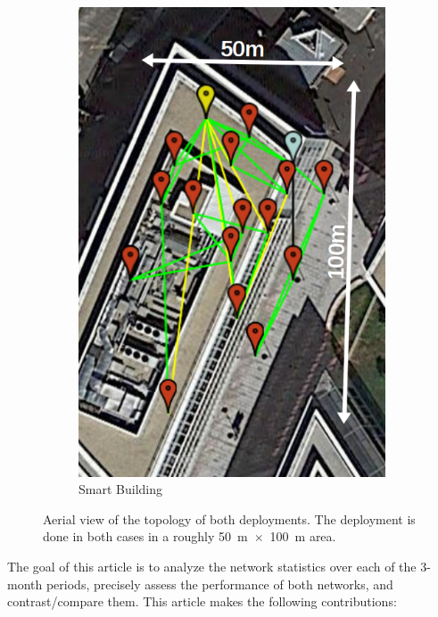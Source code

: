 \documentclass{elsarticle}
\newcommand{\building}            {Smart Building\xspace}
\begin{document}
\begin{figure}
\begin{subfigure}[h]{0.27\textwidth}
        \includegraphics[width=\textwidth]{evalab_map_annotated}
        \caption{\building}
        \label{fig:building_map}
    \end{subfigure} 
    \caption{
        Aerial view of the topology of both deployments.
        The deployment is done in both cases in a roughly 50~m~$\times$~100~m area.
    }
    \label{fig:maps}
\end{figure}


The goal of this article is to analyze the network statistics over each of the 3-month periods, precisely assess the performance of both networks, and contrast/compare them.
This article makes the following contributions:
\end{document}
